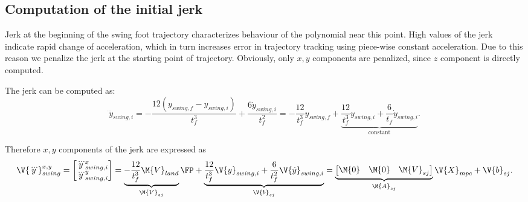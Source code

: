 \subsection{Computation of the initial jerk}
Jerk at the beginning of the swing foot trajectory characterizes behaviour of the
polynomial near this point. High values of the jerk indicate rapid change of
acceleration, which in turn increases error in trajectory tracking using piece-wise
constant acceleration. Due to this reason we penalize the jerk at the starting point
of trajectory. Obviously, only $x,y$ components are penalized, since $z$ component
is directly computed.

The jerk can be computed as:
\begin{equation}\label{wpg04.eq.swtraj_jerk}
    \dddot{y}_{swing,i}
    =
    - \frac{12(y_{swing,f} - y_{swing,i})}{t_f^3} + \frac{6\dot{y}_{swing,i}}{t_f^2}
    =
    - \frac{12}{t_f^3}y_{swing,f}
    +
    \underbrace{
        \frac{12}{t_f^3}y_{swing,i} + \frac{6}{t_f} \dot{y}_{swing,i}
    }_{\mbox{constant}}.
\end{equation}

Therefore $x,y$ components of the jerk are expressed as
\begin{equation}
    \V{\dddot{y}}_{swing}^{x,y}
    =
    \begin{bmatrix}
        \dddot{y}_{swing,i}^x\\
        \dddot{y}_{swing,i}^y\\
    \end{bmatrix}
    =
    \underbrace{
        -
        \frac{12}{t_f^3}
        \M{V}_{land}
    }_{\M{V}_{sj}}
    \FP
    +
    \underbrace{
        \frac{12}{t_f^3}
        \V{y}_{swing,i}
        +
        \frac{6}{t_f^2}
        \V{\dot{y}}_{swing,i}
    }_{\V{b}_{sj}}
    =
    \underbrace{
        \begin{bmatrix}
            \M{0}   &   \M{0}   &   \M{V}_{sj}
        \end{bmatrix}
    }_{\M{A}_{sj}}
    \V{X}_{mpc}
    +
    \V{b}_{sj}
    .
\end{equation}

